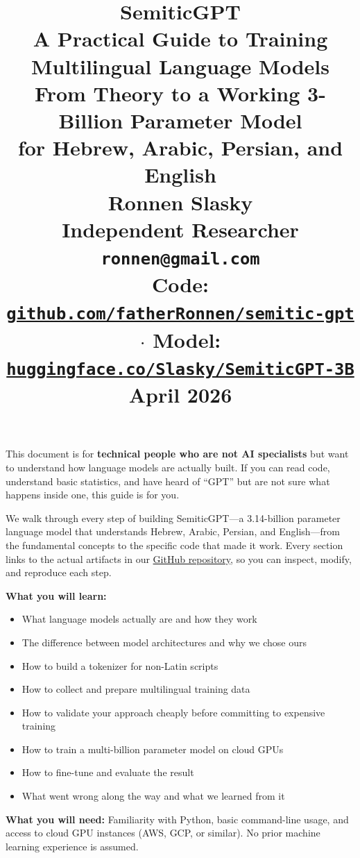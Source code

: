 \documentclass[11pt,a4paper]{article}
\title{
\vspace{-0.5in}
{\Huge\bfseries\color{accent} SemiticGPT}\\[6pt]
{\LARGE A Practical Guide to Training\\Multilingual Language Models}\\[12pt]
{\large From Theory to a Working 3-Billion Parameter Model\\for Hebrew, Arabic, Persian, and English}\\[18pt]
{\normalsize\textbf{Ronnen Slasky}}\\[4pt]
{\small Independent Researcher \quad \texttt{ronnen@gmail.com}}\\[8pt]
{\small
Code: \href{https://github.com/fatherRonnen/semitic-gpt}{\texttt{github.com/fatherRonnen/semitic-gpt}} $\cdot$
Model: \href{https://huggingface.co/Slasky/SemiticGPT-3B}{\texttt{huggingface.co/Slasky/SemiticGPT-3B}}
}\\[4pt]
{\small April 2026}
}
\author{}
\date{}
\begin{document}
\maketitle
\thispagestyle{fancy}


\begin{tcolorbox}[colback=lightaccent, colframe=accent, title={\large\bfseries Who This Guide Is For}]
This document is for \textbf{technical people who are not AI specialists} but want to understand how language models are actually built. If you can read code, understand basic statistics, and have heard of ``GPT'' but are not sure what happens inside one, this guide is for you.

We walk through every step of building SemiticGPT---a 3.14-billion parameter language model that understands Hebrew, Arabic, Persian, and English---from the fundamental concepts to the specific code that made it work. Every section links to the actual artifacts in our \href{https://github.com/fatherRonnen/semitic-gpt}{GitHub repository}, so you can inspect, modify, and reproduce each step.

\textbf{What you will learn:}
\begin{itemize}
    \item What language models actually are and how they work
    \item The difference between model architectures and why we chose ours
    \item How to build a tokenizer for non-Latin scripts
    \item How to collect and prepare multilingual training data
    \item How to validate your approach cheaply before committing to expensive training
    \item How to train a multi-billion parameter model on cloud GPUs
    \item How to fine-tune and evaluate the result
    \item What went wrong along the way and what we learned from it
\end{itemize}

\textbf{What you will need:} Familiarity with Python, basic command-line usage, and access to cloud GPU instances (AWS, GCP, or similar). No prior machine learning experience is assumed.
\end{tcolorbox}
\end{document}
